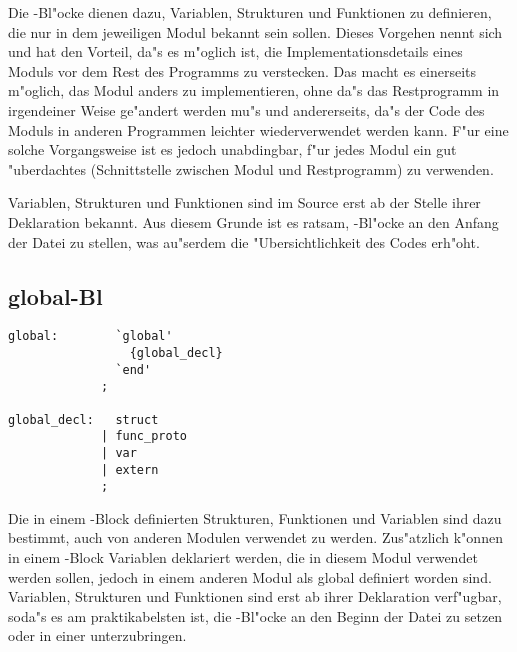 Die -Bl"ocke dienen dazu, Variablen,
Strukturen
und Funktionen
zu definieren, die nur in dem jeweiligen Modul
bekannt sein sollen. Dieses Vorgehen nennt sich  und hat den
Vorteil, da"s es m"oglich ist, die Implementationsdetails eines
Moduls vor dem Rest des Programms zu verstecken. Das macht es
einerseits m"oglich, das Modul anders zu implementieren, ohne
da"s das Restprogramm in irgendeiner Weise ge"andert werden mu"s
und andererseits, da"s der Code des Moduls in anderen Programmen
leichter wiederverwendet werden kann. F"ur eine solche Vorgangsweise
ist es jedoch unabdingbar, f"ur jedes Modul ein gut "uberdachtes
 (Schnittstelle zwischen Modul und Restprogramm) zu
verwenden.

Variablen, Strukturen und Funktionen sind im Source erst ab der
Stelle ihrer Deklaration bekannt. Aus diesem Grunde ist es
ratsam, -Bl"ocke an den Anfang der Datei zu stellen,
was au"serdem die "Ubersichtlichkeit des Codes erh"oht.

\subsection{global-Bl}

\begin{verbatim}
global:        `global'
                 {global_decl}
               `end'
             ;

global_decl:   struct
             | func_proto
             | var
             | extern
             ;
\end{verbatim}

Die in einem -Block definierten Strukturen,
Funktionen
und Variablen
sind dazu bestimmt, auch von anderen
Modulen verwendet zu werden. Zus"atzlich k"onnen in einem
-Block Variablen deklariert werden, die in diesem Modul
verwendet werden sollen, jedoch in einem anderen Modul als global
definiert worden sind. Variablen, Strukturen und Funktionen sind
erst ab ihrer Deklaration verf"ugbar, soda"s es am
praktikabelsten ist, die -Bl"ocke an den Beginn der
Datei zu setzen oder in einer  unterzubringen.

